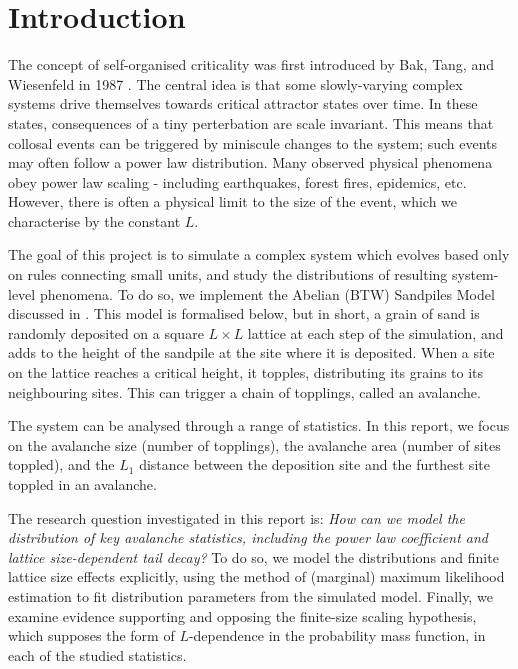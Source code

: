 \chapter{Introduction}


The concept of self-organised criticality was first introduced by Bak, Tang, and Wiesenfeld in 1987 \cite{btw1987intro}. The central idea is that some slowly-varying complex systems drive themselves towards critical attractor states over time. In these states, consequences of a tiny perterbation are scale invariant. This means that collosal events can be triggered by miniscule changes to the system; such events may often follow a power law distribution. Many observed physical phenomena obey power law scaling - including earthquakes, forest fires, epidemics, etc. However, there is often a physical limit to the size of the event, which we characterise by the constant $L$.

The goal of this project is to simulate a complex system which evolves based only on rules connecting small units, and study the distributions of resulting system-level phenomena. To do so, we implement the Abelian (BTW) Sandpiles Model discussed in \cite{btw1987intro}. This model is formalised below, but in short, a grain of sand is randomly deposited on a square $L \times L$ lattice at each step of the simulation, and adds to the height of the sandpile at the site where it is deposited. When a site on the lattice reaches a critical height, it topples, distributing its grains to its neighbouring sites. This can trigger a chain of topplings, called an avalanche.

The system can be analysed through a range of statistics. In this report, we focus on the avalanche size (number of topplings), the avalanche area (number of sites toppled), and the $L_1$ distance between the deposition site and the furthest site toppled in an avalanche. 

The research question investigated in this report is: \textit{How can we model the distribution of key avalanche statistics, including the power law coefficient and lattice size-dependent tail decay?} To do so, we model the distributions and finite lattice size effects explicitly, using the method of (marginal) maximum likelihood estimation to fit distribution parameters from the simulated model. Finally, we examine evidence supporting and opposing the finite-size scaling hypothesis, which supposes the form of $L$-dependence in the probability mass function, in each of the studied statistics.

